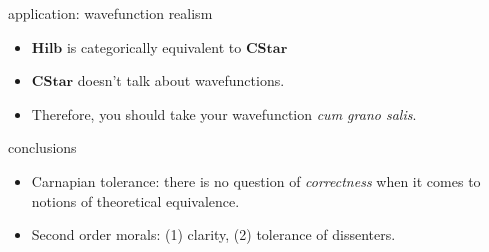 \documentclass[17pt]{beamer}
\begin{document}
\begin{frame}{application: wavefunction realism}

\begin{itemize}
\item $\mathbf{Hilb}$ is categorically equivalent to $\mathbf{CStar}$
\item $\mathbf{CStar}$ doesn't talk about wavefunctions.
\item Therefore, you should take your wavefunction \emph{cum grano
    salis}. \end{itemize}

\end{frame}


\begin{frame}{conclusions}

\begin{itemize}
\item Carnapian tolerance: there is no question of \emph{correctness}
  when it comes to notions of theoretical equivalence.
\item Second order morals: (1) clarity, \newline (2) tolerance of
  dissenters.
\end{itemize}

\end{frame}
\end{document}
